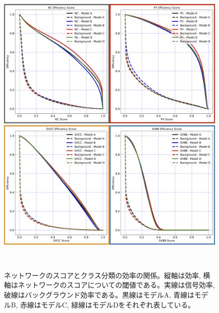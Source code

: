 \begin{figure}[htbp]
 \centering
   \begin{minipage}{1.0\textwidth}
    \centering
    \includegraphics[width=1.0\textwidth, clip]{Figure/3Networks/3-3-3-2Efficiency_Curve_1.png}
   \end{minipage}

   \begin{minipage}{1.0\textwidth}
   \centering
    \includegraphics[width=1.0\textwidth, clip]{Figure/3Networks/3-3-3-2Efficiency_Curve_2.png}
   \end{minipage}
  \caption[ネットワークのスコアとクラス分類の効率の関係]{ネットワークのスコアとクラス分類の効率の関係。縦軸は効率, 横軸はネットワークのスコアについての閾値である。実線は信号効率, 破線はバックグラウンド効率である。黒線はモデルA, 青線はモデルB, 赤線はモデルC, 緑線はモデルDをそれぞれ表している。}
\end{figure}   
\addtocounter{figure}{-1}
